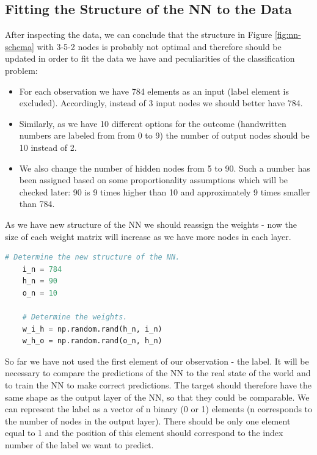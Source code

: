     \subsection{Fitting the Structure of the NN to the Data}

After inspecting the data, we can conclude that the structure in Figure \ref{fig:nn-schema} with 3-5-2 nodes is probably not optimal and therefore should be updated in order to fit the data we have and peculiarities of the classification problem: 

\begin{itemize}
    \item For each observation we have 784 elements as an input (label element is excluded). Accordingly, instead of 3 input nodes we should better have 784.
    \item Similarly, as we have 10 different options for the outcome (handwritten numbers are labeled from from 0 to 9) the number of output nodes should be 10 instead of 2. 
    \item We also change the number of hidden nodes from 5 to 90. Such a number has been assigned based on some proportionality assumptions which will be checked later: 90 is 9 times higher than 10 and approximately 9 times smaller than 784.
\end{itemize}

As we have new structure of the NN we should reassign the weights - now the size of each weight matrix will increase as we have more nodes in each layer.

\begin{lstlisting}[language=Python]
    # Determine the new structure of the NN.
    i_n = 784
    h_n = 90
    o_n = 10
    
    # Determine the weights.
    w_i_h = np.random.rand(h_n, i_n)
    w_h_o = np.random.rand(o_n, h_n)
\end{lstlisting}

So far we have not used the first element of our observation - the label. It will be necessary to compare the predictions of the NN to the real state of the world and to train the NN to make correct predictions. The target should therefore have the same shape as the output layer of the NN, so that they could be comparable. We can represent the label as a vector of n binary (0 or 1) elements (n corresponds to the number of nodes in the output layer). There should be only one element equal to 1 and the position of this element should correspond to the index number of the label we want to predict.

